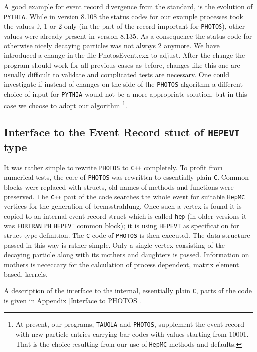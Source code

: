 \documentclass[]{Photos_interface_design}
\begin{document}
A good example for event record divergence from the standard,
is the evolution of {\tt PYTHIA}. While in version 8.108 the status codes for 
our example processes took the values 0, 1 or 2  only (in the part of the record 
important for {\tt PHOTOS}), other values were already present in
version 8.135. As a consequence the status code for 
otherwise nicely decaying particles was not always 2 anymore. We have introduced 
a change  in the file PhotosEvent.cxx to adjust. After  the change
the program should work for all previous cases as before, 
changes like this one are usually difficult to validate
and complicated  tests are necessary. One could  investigate 
if instead of changes on the side of the {\tt PHOTOS} algorithm a different choice of  input for {\tt PYTHIA} would not 
be a more appropriate 
solution, but in this case we choose to adopt our algorithm%
\footnote{ At present, our programs, {\tt TAUOLA} and
 {\tt PHOTOS}, supplement the event record with new particle entries carrying bar codes 
with values starting from 10001. That is the choice resulting from our use 
of {\tt HepMC} methods and defaults.  }.


\subsection{Interface to the Event Record stuct of {\tt HEPEVT} type}
\label{sect:F77fill}

It was rather simple to  rewrite {\tt PHOTOS} to
{\tt C++} completely. To profit from numerical tests, the  core of {\tt PHOTOS}
was rewritten to essentially  plain  {\tt C}. Common blocks were replaced
with structs, old names of methods and functions were preserved. The 
{\tt C++} part of the code searches the whole event for
suitable {\tt HepMC} vertices for the generation of bremsstrahlung. Once such
a vertex is found it is copied to an internal event record struct  which is 
called {\tt hep}  (in older versions it was {\tt FORTRAN} {\tt PH$\_$HEPEVT} common block);
it is using {\tt HEPEVT}  as specification for struct type definition.
The {\tt C} code of {\tt PHOTOS} is then executed.
The data structure passed in this way is rather simple. Only a single vertex consisting
of the decaying particle along with its mothers and daughters is passed. Information 
on mothers is nececcary  for the calculation of process dependent, matrix element based, 
kernels.



A description of the interface to the internal, essentially plain {\tt C}, parts of the code is
given in  Appendix \ref{Interface to PHOTOS}.
\end{document}
